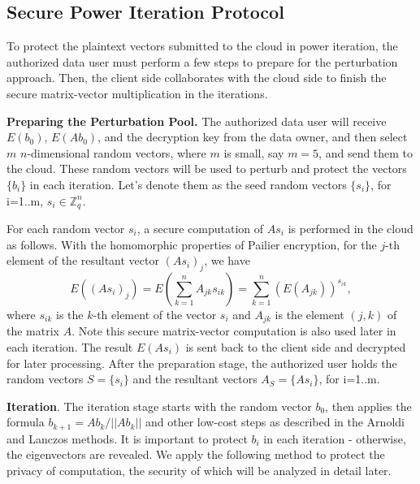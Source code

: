 \documentclass[10pt, conference, compsocconf]{IEEEtran}
\begin{document}
\subsection{Secure Power Iteration Protocol}


To protect the plaintext vectors submitted to the cloud in power iteration, the authorized data user must perform a few steps to prepare for the perturbation approach. Then, the client side collaborates with the cloud side to finish the secure matrix-vector multiplication in the iterations. 

\textbf{Preparing the Perturbation Pool.} The authorized data user will receive $E(b_0)$, $E(Ab_0)$, and the decryption key from the data owner, and then select $m$ $n$-dimensional random vectors, where $m$ is small, say $m=5$, and send them to the cloud. These random vectors will be used to perturb and protect the vectors $\{b_i\}$ in each iteration. Let's denote them as the seed random vectors $\{s_i\}$, for i=1..m, $s_i \in \mathbb{Z}_q^n$. 

For each random vector $s_i$, a secure computation of $As_i$ is performed in the cloud as follows. With the homomorphic properties of Pailier encryption, for the $j$-th element of the resultant vector $(As_i)_j$, we have
\begin{equation} \label{eq:matrix-vector2}
E((As_i)_j) = E(\sum_{k=1}^n A_{jk}s_{ik}) = \sum_{k=1}^n (E(A_{jk}))^{s_{ik}},
\end{equation}
where $s_{ik}$ is the $k$-th element of the vector $s_i$ and $A_{jk}$ is the element $(j, k)$ of the matrix $A$. 
Note this secure matrix-vector computation is also used later in each iteration. The result $E(As_i)$ is sent back to the client side and decrypted for later processing. 
After the preparation stage, the authorized user holds the random vectors $S =\{s_i\}$ and the resultant vectors $A_S=\{As_i\}$, for i=1..m.


\textbf{Iteration}. The iteration stage starts with the random vector $b_0$, then applies the formula $b_{k+1} = Ab_k/||Ab_k||$ and other low-cost steps as described in the Arnoldi and Lanczos methods. It is important to protect $b_i$ in each iteration - otherwise, the eigenvectors are revealed. 
We apply the following method to protect the privacy of computation, the security of which will be analyzed in detail later.
\end{document}
